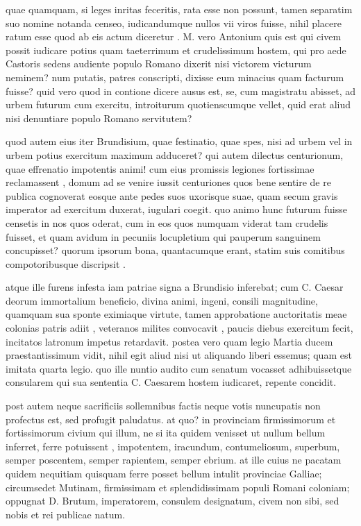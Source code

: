  quae quamquam, si leges inritas feceritis, rata esse non possunt, tamen separatim suo nomine notanda censeo, iudicandumque nullos vii viros fuisse, nihil placere ratum esse quod ab eis actum diceretur . M. vero Antonium quis est qui civem possit iudicare potius quam taeterrimum et crudelissimum hostem, qui pro aede Castoris sedens audiente populo Romano dixerit nisi victorem victurum neminem? num putatis, patres conscripti, dixisse eum minacius quam facturum fuisse? quid vero quod in contione dicere ausus est, se, cum magistratu abisset, ad urbem futurum cum exercitu, introiturum quotienscumque vellet, quid erat aliud nisi denuntiare populo Romano servitutem?

 quod autem eius iter Brundisium, quae festinatio, quae spes, nisi ad urbem vel in urbem potius exercitum maximum adduceret? qui autem dilectus centurionum, quae effrenatio impotentis animi! cum eius promissis legiones fortissimae reclamassent , domum ad se venire iussit centuriones quos bene sentire de re publica cognoverat eosque ante pedes suos uxorisque suae, quam secum gravis imperator ad exercitum duxerat, iugulari coegit. quo animo hunc futurum fuisse censetis in nos quos oderat, cum in eos quos numquam viderat tam crudelis fuisset, et quam avidum in pecuniis locupletium qui pauperum sanguinem concupisset? quorum ipsorum bona, quantacumque erant, statim suis comitibus compotoribusque discripsit .

 atque ille furens infesta iam patriae signa a Brundisio inferebat; cum C. Caesar deorum immortalium beneficio, divina animi, ingeni, consili magnitudine, quamquam sua sponte eximiaque virtute, tamen approbatione auctoritatis meae colonias patris adiit , veteranos milites convocavit , paucis diebus exercitum fecit, incitatos latronum impetus retardavit. postea vero quam legio Martia ducem praestantissimum vidit, nihil egit aliud nisi ut aliquando liberi essemus; quam est imitata quarta legio. quo ille nuntio audito cum senatum vocasset adhibuissetque consularem qui sua sententia C. Caesarem hostem iudicaret, repente concidit.

 post autem neque sacrificiis sollemnibus factis neque votis nuncupatis non profectus est, sed profugit paludatus. at quo? in provinciam firmissimorum et fortissimorum civium qui illum, ne si ita quidem venisset ut nullum bellum inferret, ferre potuissent , impotentem, iracundum, contumeliosum, superbum, semper poscentem, semper rapientem, semper ebrium. at ille cuius ne pacatam quidem nequitiam quisquam ferre posset bellum intulit provinciae Galliae; circumsedet Mutinam, firmissimam et splendidissimam populi Romani coloniam; oppugnat D. Brutum, imperatorem, consulem designatum, civem non sibi, sed nobis et rei publicae natum.

